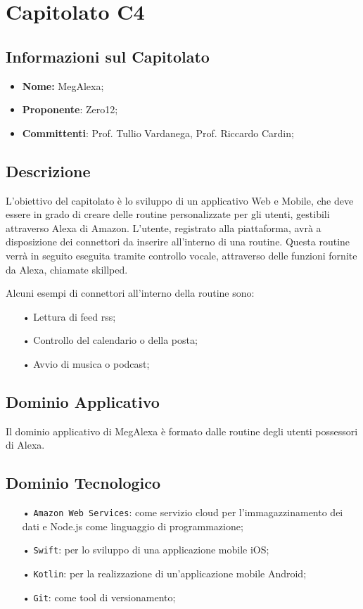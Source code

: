 \section{Capitolato C4}
\subsection{Informazioni sul Capitolato}
\begin{itemize}
	\item \textbf{Nome:} MegAlexa;
	\item \textbf{Proponente}: Zero12;
	\item \textbf{Committenti}: Prof. Tullio Vardanega, Prof. Riccardo Cardin;
\end{itemize}

\subsection{Descrizione}
L'obiettivo del capitolato è lo sviluppo di un applicativo Web e Mobile, che deve essere in grado di creare delle routine personalizzate per gli utenti, gestibili attraverso Alexa di Amazon.
L'utente, registrato alla piattaforma, avrà a disposizione dei connettori da inserire all'interno di una routine. Questa routine verrà in seguito eseguita tramite controllo vocale, attraverso delle funzioni fornite da Alexa, chiamate skillped.

Alcuni esempi di connettori all'interno della routine sono:
\begin{itemize}
\item[•] Lettura di feed rss;
\item[•] Controllo del calendario o della posta;
\item[•] Avvio di musica o podcast;
\end{itemize}

\subsection{Dominio Applicativo}
Il dominio applicativo di MegAlexa è formato dalle routine degli utenti possessori di Alexa.

\subsection{Dominio Tecnologico}
\begin{itemize}

\item[•] \texttt{Amazon Web Services}: come servizio cloud per l'immagazzinamento dei dati e Node.js come linguaggio di programmazione;
\item[•] \texttt{Swift}: per lo sviluppo di una applicazione mobile iOS;
\item[•] \texttt{Kotlin}: per la realizzazione di un'applicazione mobile Android;
\item[•] \texttt{Git}: come tool di versionamento;

\end{itemize}

